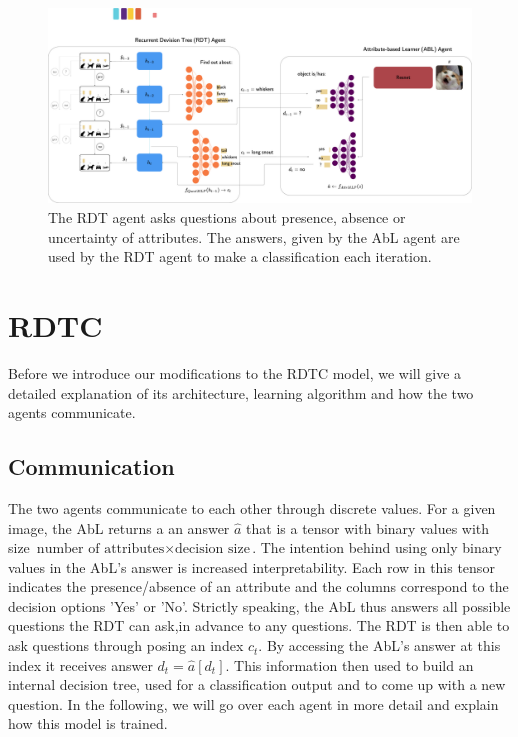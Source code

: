 \documentclass[a4paper,cleardoubleempty,BCOR1cm, 11pt]{report}
\begin{document}
\begin{figure}
	\centering
	\includegraphics[width=1\textwidth]{images/uncertaintRDTC.pdf} 
	\caption{The RDT agent asks questions about presence, absence or uncertainty of attributes. The answers, given by the AbL agent are used by the RDT agent to make a classification each iteration.}
	\label{fig:uncertainRDTC}
\end{figure}

\section{RDTC} 
Before we introduce our modifications to the RDTC model, we will give a detailed explanation of its architecture, learning algorithm and how the two agents communicate.

\subsection{Communication}
The two agents communicate to each other through discrete values. For a given image, the AbL returns a an answer $\hat{a}$ that is a tensor with binary values with size $\text{number of attributes} \times \text{decision size}$. The intention behind using only binary values in the AbL's answer is increased interpretability. Each row in this tensor indicates the presence/absence of an attribute and the columns correspond to the decision options 'Yes' or 'No'. Strictly speaking, the AbL thus answers all possible questions the RDT can ask,in advance to any questions. 
The RDT is then able to ask questions through posing an index $c_t$. By accessing the AbL's answer at this index it receives answer $d_t = \hat{a}[d_t]$. This information then used to build an internal decision tree, used for a classification output and to come up with a new question. In the following, we will go over each agent in more detail and explain how this model is trained.
\end{document}
